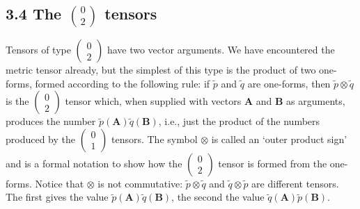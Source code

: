 \documentclass[12pt]{book}
\begin{document}
    \subsection{3.4 The \(\binom{0}{2}\) tensors}
    Tensors of type \(\left(\begin{array}{c} 0 \\ 2 \end{array}\right)\) have two vector arguments. We have encountered the metric tensor already, but the simplest of this type is the product of two one-forms, formed according to the following rule: if \(\tilde{p}\) and \(\tilde{q}\) are one-forms, then \(\tilde{p} \otimes \tilde{q}\) is the \(\left(\begin{array}{c} 0 \\ 2 \end{array}\right)\) tensor which, when supplied with vectors \(\mathbf{A}\) and \(\mathbf{B}\) as arguments, produces the number \(\tilde{p}(\mathbf{A}) \tilde{q}(\mathbf{B})\), i.e., just the product of the numbers produced by the \(\left(\begin{array}{c} 0 \\ 1 \end{array}\right)\) tensors. The symbol \(\otimes\) is called an ‘outer product sign’ and is a formal notation to show how the \(\left(\begin{array}{c} 0 \\ 2 \end{array}\right)\) tensor is formed from the one-forms. Notice that \(\otimes\) is not commutative: \(\tilde{p} \otimes \tilde{q}\) and \(\tilde{q} \otimes \tilde{p}\) are different tensors. The first gives the value \(\tilde{p}(\mathbf{A}) \tilde{q}(\mathbf{B})\), the second the value \(\tilde{q}(\mathbf{A}) \tilde{p}(\mathbf{B})\).
    
\end{document}
